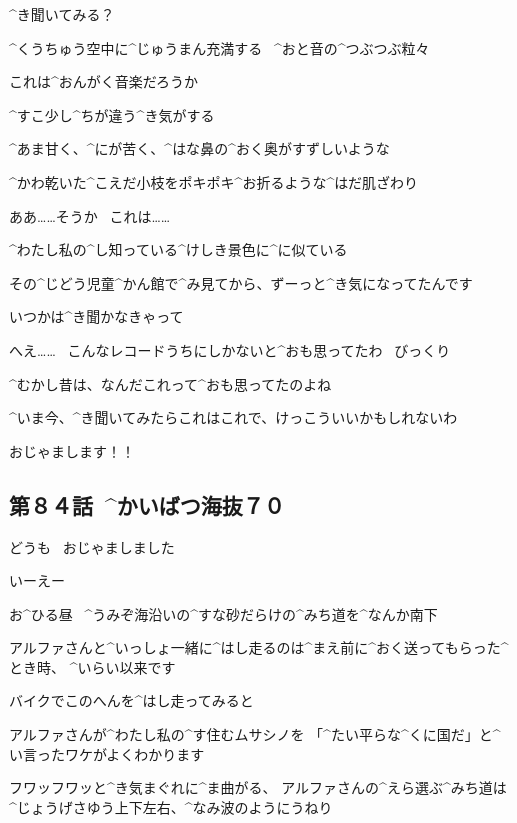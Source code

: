 \Sensei ^{き}{聞}いてみる？

\page[91]
\Kokone ^{くうちゅう}{空中}に^{じゅうまん}{充満}する
\ ^{おと}{音}の^{つぶつぶ}{粒々}

\Kokone これは^{おんがく}{音楽}だろうか

\Kokone ^{すこ}{少}し^{ちが}{違}う^{き}{気}がする

\Kokone ^{あま}{甘}く、^{にが}{苦}く、^{はな}{鼻}の^{おく}{奥}がすずしいような

\Kokone ^{かわ}{乾}いた^{こえだ}{小枝}をポキポキ^{お}{折}るような^{はだ}{肌}ざわり

\Kokone ああ……そうか
\ これは……

\Kokone ^{わたし}{私}の^{し}{知}っている^{けしき}{景色}に^{に}{似}ている

\page[93]
\Kokone その^{じどう}{児童}^{かん}{館}で^{み}{見}てから、ずーっと^{き}{気}になってたんです

\Kokone いつかは^{き}{聞}かなきゃって

\Sensei へえ……
\ こんなレコードうちにしかないと^{おも}{思}ってたわ
\ びっくり

\Sensei ^{むかし}{昔}は、なんだこれって^{おも}{思}ってたのよね

\Sensei ^{いま}{今}、^{き}{聞}いてみたらこれはこれで、けっこういいかもしれないわ

\page[94]
\Alpha おじゃまします！！


\subsection{第８４話\ ^{かいばつ}{海抜}７０}

\page[96]
\Kokone どうも
\ おじゃましました

\Sensei いーえー

\page[97]
\Kokone お^{ひる}{昼}
\ ^{うみぞ}{海沿}いの^{すな}{砂}だらけの^{みち}{道}を^{なんか}{南下}

\Kokone アルファさんと^{いっしょ}{一緒}に^{はし}{走}るのは^{まえ}{前}に^{おく}{送}ってもらった^{とき}{時}、
^{いらい}{以来}です

\page[98]
\Kokone バイクでこのへんを^{はし}{走}ってみると

\Kokone アルファさんが^{わたし}{私}の^{す}{住}むムサシノを
「^{たい}{平}らな^{くに}{国}だ」と^{い}{言}ったワケがよくわかります

\page[99]
\Kokone フワッフワッと^{き}{気}まぐれに^{ま}{曲}がる、
アルファさんの^{えら}{選}ぶ^{みち}{道}は^{じょうげさゆう}{上下左右}、^{なみ}{波}のようにうねり

